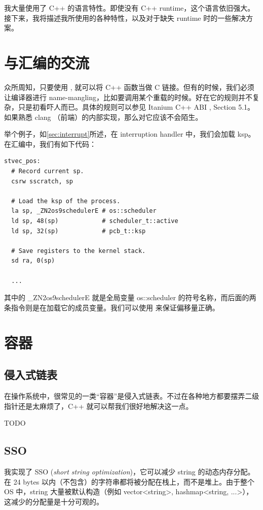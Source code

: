我大量使用了 C++ 的语言特性。即使没有 C++ runtime，这个语言依旧强大。接下来，我将描述我所使用的各种特性，以及对于缺失 runtime 时的一些解决方案。

\section{与汇编的交流}

众所周知，只要使用 , 就可以将 C++ 函数当做 C 链接。但有的时候，我们必须让编译器进行 name-mangling，比如要调用某个重载的时候。好在它的规则并不复杂，只是初看吓人而已。具体的规则可以参见 Itanium C++ ABI \cite{itanium}, Section 5.1。如果熟悉 clang （前端）的内部实现，那么对它应该不会陌生。

举个例子，如\cref{sec:interrupt}所述，在 interruption handler 中，我们会加载 ksp。在汇编中，我们有如下代码：
\begin{verbatim}
stvec_pos:
  # Record current sp.
  csrw sscratch, sp
  
  # Load the ksp of the process.
  la sp, _ZN2os9schedulerE # os::scheduler
  ld sp, 48(sp)            # scheduler_t::active
  ld sp, 32(sp)            # pcb_t::ksp

  # Save registers to the kernel stack.
  sd ra, 0(sp)

  ...
\end{verbatim}

其中的 \_ZN2os9schedulerE 就是全局变量 os::scheduler 的符号名称，而后面的两条指令则是在加载它的成员变量。我们可以使用  来保证偏移量正确。

\section{容器}
\label{sec:container}

\subsection{侵入式链表}

在操作系统中，很常见的一类“容器”是侵入式链表。不过在各种地方都要摆弄二级指针还是太麻烦了，C++ 就可以帮我们很好地解决这一点。

TODO

\subsection{SSO}
\label{subsect:sso}

我实现了 SSO (\textit{short string optimization})，它可以减少 string 的动态内存分配。在 24 bytes 以内（不包含）的字符串都将被分配在栈上，而不是堆上。由于整个 OS 中，string 大量被默认构造（例如 vector<string>, hashmap<string, ...>），这减少的分配量是十分可观的。

